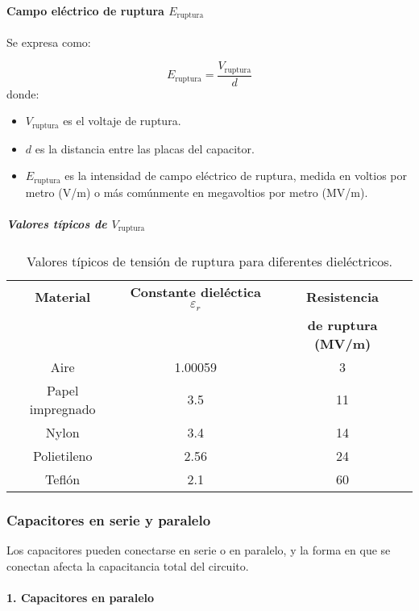 \paragraph{Campo eléctrico de ruptura \( E_{\text{ruptura}} \)}

Se expresa como:

\[
E_{\text{ruptura}} = \frac{V_{\text{ruptura}}}{d}
\]
donde:
\begin{itemize}
    \item \( V_{\text{ruptura}} \) es el voltaje de ruptura.
    \item \( d \) es la distancia entre las placas del capacitor.
    \item \( E_{\text{ruptura}} \) es la intensidad de campo eléctrico de ruptura, medida en voltios por metro (V/m) o más comúnmente en megavoltios por metro (MV/m).
\end{itemize}

\subparagraph{Valores típicos de \( V_{\text{ruptura}} \)}

\begin{table*}[ht]
    \centering
    \begin{tabular}{|c|c|c|}
        \hline
        \textbf{Material} & \textbf{Constante dieléctica \(\varepsilon_r\)} & \textbf{Resistencia}\\ 
        &&\textbf{de ruptura (MV/m)} \\
        \hline
        Aire & 1.00059 & 3 \\
        Papel impregnado & 3.5 & 11 \\
        Nylon & 3.4 & 14 \\
        Polietileno & 2.56 & 24 \\
        Teflón & 2.1 & 60 \\
        \hline
    \end{tabular}
    \caption{Valores típicos de tensión de ruptura para diferentes dieléctricos.}
    \label{tab:ruptura}
\end{table*}

\subsubsection{Capacitores en serie y paralelo}

Los capacitores pueden conectarse en serie o en paralelo, y la forma en que se conectan afecta la capacitancia total del circuito.

\paragraph{1. Capacitores en paralelo}

